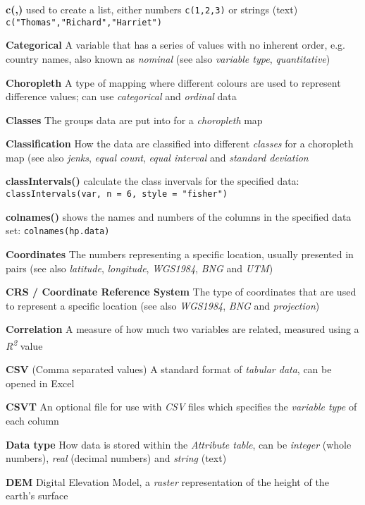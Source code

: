 \documentclass[a4paper,10pt]{article}
\begin{document}
\begin{multicols}{2}
\textbf{c(,)} used to create a list, either numbers \texttt{c(1,2,3)} or strings (text) \texttt{c("Thomas","Richard","Harriet")}

\textbf{Categorical} A variable that has a series of values with no inherent order, e.g. country names, also known as \textit{nominal} (see also \textit{variable type}, \textit{quantitative}) 

\textbf{Choropleth} A type of mapping where different colours are used to represent difference values; can use \textit{categorical} and \textit{ordinal} data

\textbf{Classes} The groups data are put into for a \textit{choropleth} map

\textbf{Classification} How the data are classified into different \textit{classes} for a choropleth map (see also \textit{jenks}, \textit{equal count}, \textit{equal interval} and \textit{standard deviation}

\textbf{classIntervals()} calculate the class invervals for the specified data: \texttt{classIntervals(var, n = 6, style = "fisher")}

\textbf{colnames()} shows the names and numbers of the columns in the specified data set: \texttt{colnames(hp.data)}

\textbf{Coordinates} The numbers representing a specific location, usually presented in pairs (see also \textit{latitude}, \textit{longitude}, \textit{WGS1984}, \textit{BNG} and \textit{UTM})

\textbf{CRS / Coordinate Reference System} The type of coordinates that are used to represent a specific location (see also \textit{WGS1984}, \textit{BNG} and \textit{projection})

\textbf{Correlation} A measure of how much two variables are related, measured using a \textit{R\textsuperscript{2}} value 

\textbf{CSV} (Comma separated values) A standard format of \textit{tabular data}, can be opened in Excel  

\textbf{CSVT} An optional file for use with \textit{CSV} files which specifies the \textit{variable type} of each column %

\textbf{Data type} How data is stored within the \textit{Attribute table}, can be \textit{integer} (whole numbers), \textit{real} (decimal numbers) and \textit{string} (text) 

\textbf{DEM} Digital Elevation Model, a \textit{raster} representation of the height of the earth's surface


\end{multicols}
\end{document}
